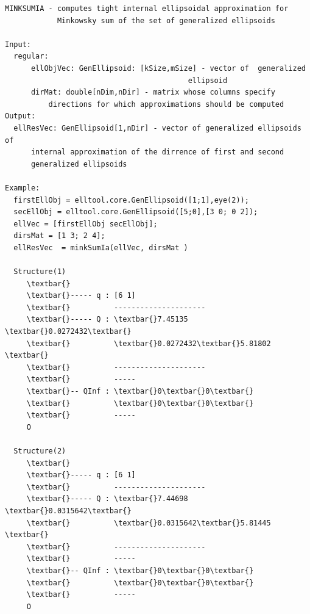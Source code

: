 \documentclass[letterpaper,10pt,english]{sphinxmanual}
\begin{document}
\begin{Verbatim}[commandchars=\\\{\}]
MINKSUMIA - computes tight internal ellipsoidal approximation for
            Minkowsky sum of the set of generalized ellipsoids

Input:
  regular:
      ellObjVec: GenEllipsoid: [kSize,mSize] - vector of  generalized
                                          ellipsoid
      dirMat: double[nDim,nDir] - matrix whose columns specify
          directions for which approximations should be computed
Output:
  ellResVec: GenEllipsoid[1,nDir] - vector of generalized ellipsoids of
      internal approximation of the dirrence of first and second
      generalized ellipsoids

Example:
  firstEllObj = elltool.core.GenEllipsoid([1;1],eye(2));
  secEllObj = elltool.core.GenEllipsoid([5;0],[3 0; 0 2]);
  ellVec = [firstEllObj secEllObj];
  dirsMat = [1 3; 2 4];
  ellResVec  = minkSumIa(ellVec, dirsMat )

  Structure(1)
     \textbar{}
     \textbar{}----- q : [6 1]
     \textbar{}          ---------------------
     \textbar{}----- Q : \textbar{}7.45135  \textbar{}0.0272432\textbar{}
     \textbar{}          \textbar{}0.0272432\textbar{}5.81802  \textbar{}
     \textbar{}          ---------------------
     \textbar{}          -----
     \textbar{}-- QInf : \textbar{}0\textbar{}0\textbar{}
     \textbar{}          \textbar{}0\textbar{}0\textbar{}
     \textbar{}          -----
     O

  Structure(2)
     \textbar{}
     \textbar{}----- q : [6 1]
     \textbar{}          ---------------------
     \textbar{}----- Q : \textbar{}7.44698  \textbar{}0.0315642\textbar{}
     \textbar{}          \textbar{}0.0315642\textbar{}5.81445  \textbar{}
     \textbar{}          ---------------------
     \textbar{}          -----
     \textbar{}-- QInf : \textbar{}0\textbar{}0\textbar{}
     \textbar{}          \textbar{}0\textbar{}0\textbar{}
     \textbar{}          -----
     O
\end{Verbatim}
\end{document}
